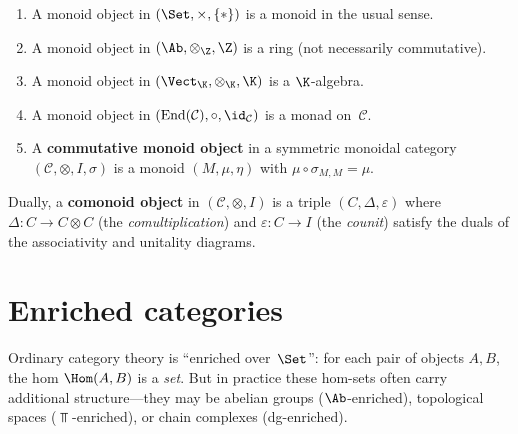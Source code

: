 \begin{example}\label{ex:monoid-objects}
\begin{enumerate}[label=(\roman*)]
\item A monoid object in $(\Set, \times, \{*\})$ is a monoid in the
      usual sense.
\item A monoid object in $(\Ab, \otimes_\Z, \Z)$ is a ring (not
      necessarily commutative).
\item A monoid object in $(\Vect_\K, \otimes_\K, \K)$ is a
      $\K$-algebra.
\item A monoid object in $(\mathrm{End}(\mathcal{C}), \circ, \id_\mathcal{C})$
      is a monad on~$\mathcal{C}$.
\item A \textbf{commutative monoid object} in a symmetric monoidal
      category $(\mathcal{C}, \otimes, I, \sigma)$ is a monoid $(M,\mu,\eta)$
      with $\mu \circ \sigma_{M,M} = \mu$.
\end{enumerate}
\end{example}

\begin{definition}\label{def:comonoid}
Dually, a \textbf{comonoid object} in $(\mathcal{C}, \otimes, I)$ is
a triple $(C, \Delta, \varepsilon)$ where
$\Delta\colon C\to C\otimes C$ (the \emph{comultiplication}) and
$\varepsilon\colon C\to I$ (the \emph{counit}) satisfy the duals of
the associativity and unitality diagrams.
\end{definition}



\section{Enriched categories}\label{sec:enriched}


Ordinary category theory is ``enriched over~$\Set$'': for each pair of
objects $A,B$, the hom $\Hom(A,B)$ is a \emph{set}.  But in practice
these hom-sets often carry additional structure---they may be abelian
groups ($\Ab$-enriched), topological spaces ($\Top$-enriched), or
chain complexes (dg-enriched).

